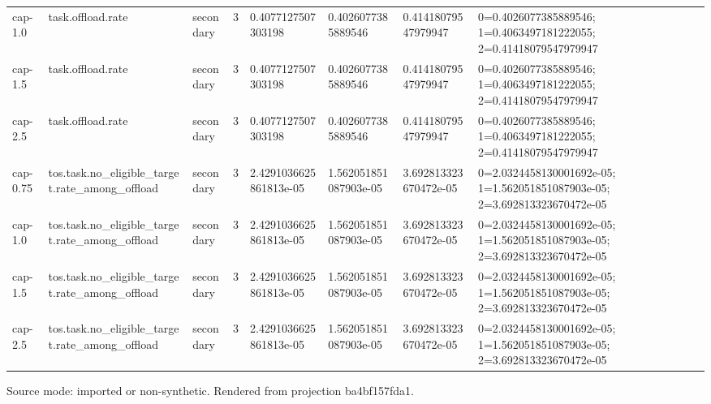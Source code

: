 {\begin{table}[htbp]
\begin{tabular}{llllllll}
cap-1.0 & task.offload.rate & secondary & 3 & 0.4077127507303198 & 0.4026077385889546 & 0.41418079547979947 & 0=0.4026077385889546; 1=0.4063497181222055; 2=0.41418079547979947 \\
cap-1.5 & task.offload.rate & secondary & 3 & 0.4077127507303198 & 0.4026077385889546 & 0.41418079547979947 & 0=0.4026077385889546; 1=0.4063497181222055; 2=0.41418079547979947 \\
cap-2.5 & task.offload.rate & secondary & 3 & 0.4077127507303198 & 0.4026077385889546 & 0.41418079547979947 & 0=0.4026077385889546; 1=0.4063497181222055; 2=0.41418079547979947 \\
cap-0.75 & tos.task.no\_eligible\_target.rate\_among\_offload & secondary & 3 & 2.4291036625861813e-05 & 1.562051851087903e-05 & 3.692813323670472e-05 & 0=2.0324458130001692e-05; 1=1.562051851087903e-05; 2=3.692813323670472e-05 \\
cap-1.0 & tos.task.no\_eligible\_target.rate\_among\_offload & secondary & 3 & 2.4291036625861813e-05 & 1.562051851087903e-05 & 3.692813323670472e-05 & 0=2.0324458130001692e-05; 1=1.562051851087903e-05; 2=3.692813323670472e-05 \\
cap-1.5 & tos.task.no\_eligible\_target.rate\_among\_offload & secondary & 3 & 2.4291036625861813e-05 & 1.562051851087903e-05 & 3.692813323670472e-05 & 0=2.0324458130001692e-05; 1=1.562051851087903e-05; 2=3.692813323670472e-05 \\
cap-2.5 & tos.task.no\_eligible\_target.rate\_among\_offload & secondary & 3 & 2.4291036625861813e-05 & 1.562051851087903e-05 & 3.692813323670472e-05 & 0=2.0324458130001692e-05; 1=1.562051851087903e-05; 2=3.692813323670472e-05 \\
\hline
\end{tabular}
\par\footnotesize
Source mode: imported or non-synthetic.
Rendered from projection ba4bf157fda1.
\end{table}
}
